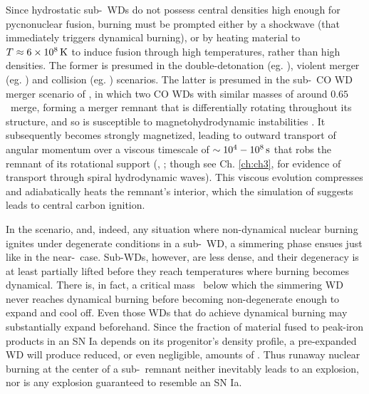 Since hydrostatic sub-\Mch\ WDs do not possess central densities high enough for pycnonuclear fusion, burning must be prompted either by a shockwave (that immediately triggers dynamical burning), or by heating material to $T\approx6\times10^8\,\mathrm{K}$ to induce fusion through high temperatures, rather than high densities.  The former is presumed in {\charles the double-detonation (eg. \citealt{fink+07, woosk11, pakm+13, shenm14})}, violent merger (eg. \citealt{pakm+10}) and collision (eg. \citealt{loreig10}) scenarios.  The latter is presumed in the sub-\Mch\ CO WD merger scenario of \citeal{vkercj10}, in which two CO WDs {\charles with similar masses of around $0.65$} \Msun\ merge, forming a merger remnant that is differentially rotating throughout its structure, and so is susceptible to magnetohydrodynamic instabilities \citep{shen+12, ji+13}.  It subsequently becomes strongly magnetized, leading to outward transport of angular momentum over a viscous timescale of $\sim10^4 - 10^8\,\mathrm{s}$ that robs the remnant of its rotational support (\citeal{vkercj10}, \citealt{shen+12}; though see Ch. \ref{ch:ch3}, \citealt{kash+15} for evidence of transport through spiral hydrodynamic waves).  This viscous evolution compresses and adiabatically heats the remnant's interior, which the simulation of \cite{ji+13} suggests leads to central carbon ignition.

In the \citeal{vkercj10} scenario, and, indeed, any situation where non-dynamical nuclear burning ignites under degenerate conditions in a sub-\Mch\ WD, a simmering phase ensues just like in the near-\Mch\ case.  Sub-\Mch WDs, however, are less dense, and their degeneracy is at least partially lifted before they reach temperatures where burning becomes dynamical.  There is, in fact, a critical mass \Mcrit\ below which the simmering WD never reaches dynamical burning before becoming non-degenerate enough to expand and cool off.  Even those WDs that do achieve dynamical burning may substantially expand beforehand.  Since the fraction of material fused to peak-iron products in an SN Ia depends on its progenitor's density profile, a pre-expanded WD will produce reduced, or even negligible, amounts of \Ni.  Thus {\charles runaway nuclear burning} at the center of a sub-\Mch\ remnant neither inevitably leads to an explosion, nor is any explosion guaranteed to resemble an SN Ia.

